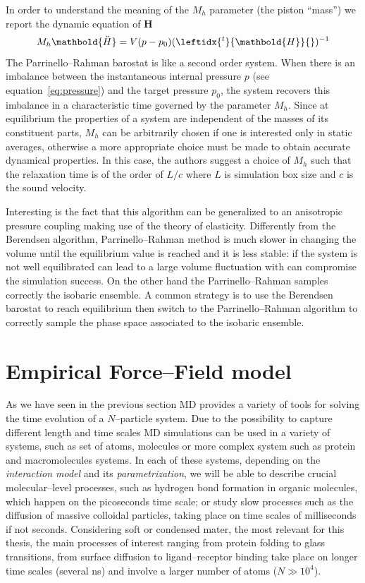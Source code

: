 In order to understand the meaning of the $M_h$ parameter (the piston ``mass'') we report the dynamic equation of $\mathbold H$
\begin{equation*}
	M_h \mathbold{\ddot H} = V (p - p_0) (\leftidx{^t}{\mathbold{H}}{})^{-1}
\end{equation*}
The Parrinello--Rahman barostat is like a second order system. When there is an imbalance between the
instantaneous internal pressure $p$ (see equation~\eqref{eq:pressure}) and the target pressure $p_0$, the system
recovers this imbalance in a characteristic time governed by the parameter $M_h$. Since at equilibrium the
properties of a system are independent of the masses of its constituent parts, $M_h$ can be arbitrarily chosen if
one is interested only in static averages, otherwise a more appropriate choice must be made to obtain accurate
dynamical properties. In this case, the authors suggest a choice of $M_h$ such that the relaxation time is of the
order of $L/c$ where $L$ is simulation box size and $c$ is the sound velocity.

Interesting is the fact that this algorithm can be generalized to an anisotropic pressure coupling making use of
the theory of elasticity. Differently from the Berendsen algorithm, Parrinello--Rahman method is much slower in
changing the volume until the equilibrium value is reached and it is less stable: if the system is not well
equilibrated can lead to a large volume fluctuation with can compromise the simulation success. On the other hand
the Parrinello--Rahman samples correctly the isobaric ensemble. A common strategy is to use the Berendsen
barostat to reach equilibrium then switch to the Parrinello--Rahman algorithm to correctly sample the phase space
associated to the isobaric ensemble.


\section{Empirical Force--Field model}
\label{sec:EmpiricalFF}
As we have seen in the previous section \ac{MD} provides a variety of tools for solving the time evolution of a
$N$--particle system. Due to the possibility to capture different length and time scales \ac{MD} simulations can
be used in a variety of systems, such as set of atoms, molecules or more complex system such as protein and
macromolecules systems. In each of these systems, depending on the \textit{interaction model} and its
\textit{parametrization}, we will be able to describe crucial molecular--level processes, such as hydrogen bond
formation in organic molecules, which happen on the picoseconds time scale; or study slow processes such as the
diffusion of massive colloidal particles, taking place on time scales of milliseconds if not seconds. Considering soft or condensed mater, the most relevant for this thesis, the main processes of interest
ranging from protein folding to glass transitions, from surface diffusion to ligand--receptor binding take place
on longer time scales (several ns) and involve a larger number of atoms ($N \gg 10^4$).


